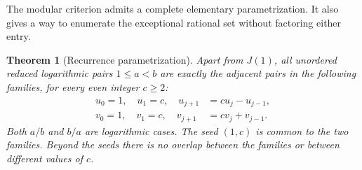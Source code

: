 \documentclass[11pt]{article}
\numberwithin{equation}{section}
\newtheorem{theorem}{Theorem}[section]
\theoremstyle{definition}
\theoremstyle{remark}
\begin{document}
The modular criterion admits a complete elementary parametrization.
It also gives a way to enumerate the exceptional rational set without
factoring either entry.

\begin{theorem}[Recurrence parametrization]\label{thm:recurrences}
Apart from $J(1)$, all unordered reduced logarithmic pairs $1\le a<b$
are exactly the adjacent pairs in the following families, for every even
integer $c\ge2$:
\begin{align}
 u_0=1,\quad u_1=c,\quad u_{j+1}&=c u_j-u_{j-1},\label{eq:minus-rec}\\
 v_0=1,\quad v_1=c,\quad v_{j+1}&=c v_j+v_{j-1}.\label{eq:plus-rec}
\end{align}
Both $a/b$ and $b/a$ are logarithmic cases. The seed $(1,c)$ is common
to the two families. Beyond the seeds there is no overlap between the
families or between different values of $c$.
\end{theorem}
\end{document}
